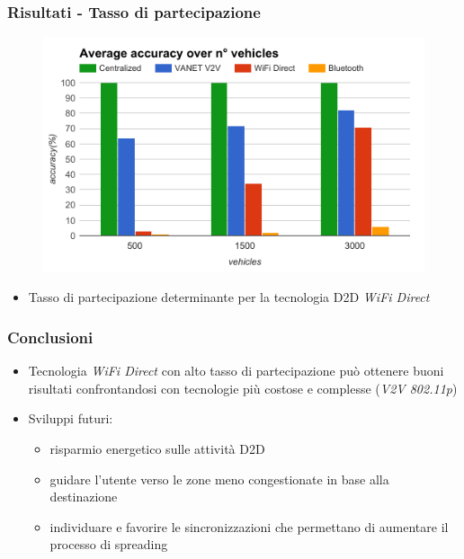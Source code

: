 \documentclass{beamer}
\begin{document}
\begin{frame}
  \frametitle{Risultati - Tasso di partecipazione}

      \begin{figure}
      \includegraphics[scale=0.4]{img/graphics/n_car.png}
      \end{figure}
      \begin{itemize}
	\item  Tasso di partecipazione determinante per la tecnologia D2D \textit{WiFi Direct}
      \end{itemize}
 
\end{frame}


\begin{frame}
\frametitle{Conclusioni}
  \begin{itemize}
    \item Tecnologia \textit{WiFi Direct} con alto tasso di partecipazione può ottenere buoni risultati confrontandosi con tecnologie più costose e complesse (\textit{V2V 802.11p})
    \item Sviluppi futuri: 
      \begin{itemize}
	\item risparmio energetico sulle attività D2D
	\item guidare l'utente verso le zone meno congestionate in base alla destinazione
	\item individuare e favorire le sincronizzazioni che permettano di aumentare il processo di spreading
      \end{itemize}
  \end{itemize}
\end{frame}
\end{document}
